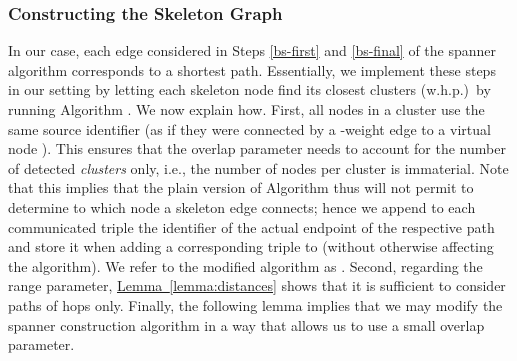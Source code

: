 \documentclass[letterpaper,11pt]{article}
\newcommand{\namedref}[2]{\hyperref[#2]{#1~\ref*{#2}}}
\newcommand{\lemmaref}[1]{\namedref{Lemma}{#1}}
\begin{document}
\subsubsection*{Constructing the Skeleton Graph}

In our case, each edge considered in Steps \eqref{bs-first} and \eqref{bs-final}
of the spanner algorithm corresponds to a shortest path. Essentially, we
implement these steps in our setting by letting each skeleton node find its
closest  clusters (w.h.p.)\ by running Algorithm .
We now explain how. First, all nodes  in a cluster  use the same source
identifier  (as if they were connected by a -weight
edge to a virtual node ). This ensures that the overlap parameter needs to
account for the number of detected \emph{clusters} only, i.e., the number of
nodes per cluster is immaterial. Note that this implies that the plain version
of Algorithm  thus will not permit to determine to which node a skeleton
edge connects; hence we append to each communicated triple  the
identifier of the actual endpoint  of the respective path and store
it when adding a corresponding triple to  (without otherwise affecting the
algorithm). We refer to the modified algorithm as . Second, regarding the
range parameter, \lemmaref{lemma:distances} shows that it is sufficient to
consider paths of  hops only. Finally, the following lemma
implies that we may modify the spanner construction algorithm in a way that
allows us to use a small overlap parameter.
\end{document}
